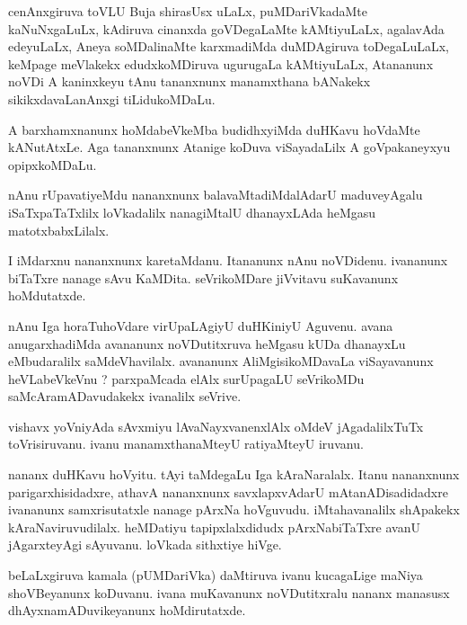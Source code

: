 \documentclass{article}
\begin{document}
\begin{mn}
cenAnxgiruva toVLU Buja shirasUsx uLaLx, puMDariVkadaMte kaNuNxgaLuLx,  kAdiruva  
cinanxda goVDegaLaMte  kAMtiyuLaLx,  agalavAda edeyuLaLx, Aneya soMDalinaMte  
karxmadiMda duMDAgiruva toDegaLuLaLx, keMpage meVlakekx edudxkoMDiruva ugurugaLa  kAMtiyuLaLx,  
Atananunx noVDi A kaninxkeyu tAnu tananxnunx  manamxthana bANakekx sikikxdavaLanAnxgi tiLidukoMDaLu.
\end{mn}

\begin{mn}
A barxhamxnanunx hoMdabeVkeMba budidhxyiMda duHKavu hoVdaMte kANutAtxLe.  
Aga tananxnunx Atanige koDuva viSayadaLilx  A goVpakaneyxyu opipxkoMDaLu.
\end{mn}

\begin{mn}
nAnu rUpavatiyeMdu nananxnunx balavaMtadiMdalAdarU maduveyAgalu  iSaTxpaTaTxlilx  
loVkadalilx nanagiMtalU  dhanayxLAda  heMgasu matotxbabxLilalx.
\end{mn}

\begin{mn}
I iMdarxnu nananxnunx karetaMdanu.  Itananunx  nAnu noVDidenu.  ivananunx  
biTaTxre nanage  sAvu KaMDita. seVrikoMDare  jiVvitavu  suKavanunx hoMdutatxde.
\end{mn}

\begin{mn}
nAnu Iga horaTuhoVdare virUpaLAgiyU duHKiniyU Aguvenu.  avana anugarxhadiMda 
avananunx noVDutitxruva  heMgasu kUDa  dhanayxLu eMbudaralilx  saMdeVhavilalx.  
avananunx  AliMgisikoMDavaLa  viSayavanunx  heVLabeVkeVnu ?  parxpaMcada elAlx  
surUpagaLU seVrikoMDu saMcAramADavudakekx  ivanalilx seVrive.
\end{mn}

\begin{mn}
vishavx yoVniyAda  sAvxmiyu lAvaNayxvanenxlAlx  oMdeV jAgadalilxTuTx  toVrisiruvanu.  
ivanu  manamxthanaMteyU  ratiyaMteyU iruvanu.
\end{mn}

\begin{mn}
nananx duHKavu hoVyitu.  tAyi taMdegaLu Iga kAraNaralalx.  Itanu nananxnunx parigarxhisidadxre,  
athavA nananxnunx savxlapxvAdarU  mAtanADisadidadxre  ivananunx samxrisutatxle nanage pArxNa 
hoVguvudu.  iMtahavanalilx  shApakekx kAraNaviruvudilalx.  heMDatiyu tapipxlalxdidudx 
pArxNabiTaTxre avanU jAgarxteyAgi sAyuvanu.  loVkada sithxtiye hiVge.
\end{mn}

\begin{mn}
beLaLxgiruva kamala (pUMDariVka) daMtiruva ivanu kucagaLige maNiya  shoVBeyanunx  koDuvanu.  
ivana  muKavanunx  noVDutitxralu nananx manasusx dhAyxnamADuvikeyanunx  hoMdirutatxde.
\end{mn}
\end{document}
